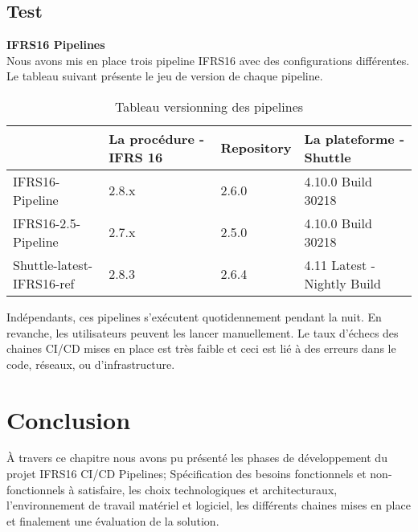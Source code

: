 \begin{spacing}{1.2}
\subsection{Test}
\textbf{IFRS16 Pipelines}\\
Nous avons mis en place trois pipeline IFRS16 avec des configurations différentes. Le tableau suivant présente le jeu de version de chaque pipeline. 
\begin{table}[ht]
	\centering
	\caption{Tableau versionning des pipelines}
	\footnotesize
	\begin{tabularx}{\textwidth}{|p{4cm}|X|X|X|}
          \hline & {\textbf{La procédure - IFRS 16}} & {\textbf{Repository}} & {\textbf{La plateforme - Shuttle}}  \\
          \hline
          IFRS16-Pipeline  & 2.8.x & 2.6.0 & 4.10.0 Build 30218\\
          \hline
          IFRS16-2.5-Pipeline & 2.7.x & 2.5.0 & 4.10.0 Build 30218 \\
          \hline
          Shuttle-latest-IFRS16-ref & 2.8.3 & 2.6.4 & 4.11 Latest - Nightly Build \\ 
          \hline
        \end{tabularx}
	\label{tab:exple}
\end{table}
\FloatBarrier
Indépendants, ces pipelines s'exécutent quotidennement pendant la nuit. En revanche, les utilisateurs peuvent les lancer manuellement. Le taux d'échecs des chaines CI/CD mises en place est très faible et ceci est lié à des erreurs dans le code, réseaux, ou d'infrastructure. 

\section*{Conclusion}
À travers ce chapitre nous avons pu présenté les phases de développement du projet IFRS16 CI/CD Pipelines; Spécification des besoins fonctionnels et non-fonctionnels à satisfaire, les choix technologiques et architecturaux, l'environnement de travail matériel et logiciel, les différents chaines mises en place et finalement une évaluation de la solution.





\end{spacing}
